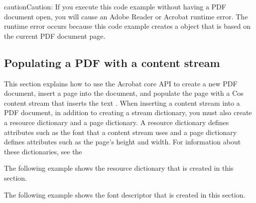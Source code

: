 \documentclass[letterpaper,12pt,english,openany,oneside]{sphinxmanual}
\begin{document}
\begin{sphinxVerbatim}[commandchars=\\\{\}]
         
  
\end{sphinxVerbatim}

\begin{sphinxadmonition}{caution}{Caution:}
If you execute this code example without having a PDF document open, you will cause an Adobe Reader or Acrobat run\sphinxhyphen{}time error. The run\sphinxhyphen{}time error occurs because this code example creates a  object that is based on the current PDF document page.
\end{sphinxadmonition}


\subsection{Populating a PDF with a content stream}
\label{\detokenize{Plugins_Cos:populating-a-pdf-with-a-content-stream}}
This section explains how to use the Acrobat core API to create a new PDF document, insert a page into the document, and populate the page with a Cos content stream that inserts the text  . When inserting a content stream into a PDF document, in addition to creating a stream dictionary, you must also create a resource dictionary and a page dictionary. A resource dictionary defines attributes such as the font that a content stream uses and a page dictionary defines attributes such as the page’s height and width. For information about these dictionaries, see the 

The following example shows the resource dictionary that is created in this section.

\begin{sphinxVerbatim}[commandchars=\\\{\}]
  
      
   
\end{sphinxVerbatim}

The following example shows the font descriptor that is created in this section.
\end{document}
